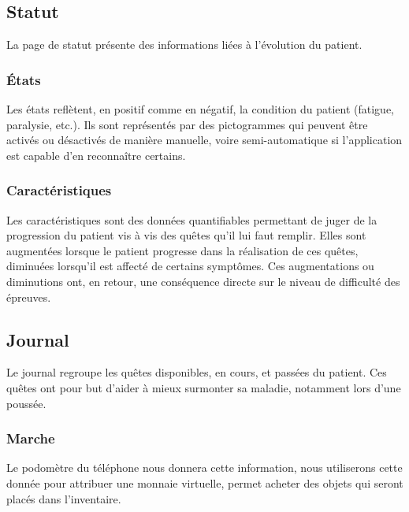 \documentclass[a4paper,12pt,francais]{article}
\begin{document}
\subsection{Statut}

La page de statut présente des informations liées à l'évolution du patient.

\subsubsection{États}
Les états reflètent, en positif comme en négatif, la condition du patient (fatigue, paralysie, etc.). Ils sont représentés par des pictogrammes qui peuvent être activés ou désactivés de manière manuelle, voire semi-automatique si l'application est capable d'en reconnaître certains.

\subsubsection{Caractéristiques}
Les caractéristiques sont des données quantifiables permettant de juger de la progression du patient vis à vis des quêtes qu'il lui faut remplir. Elles sont augmentées lorsque le patient progresse dans la réalisation de ces quêtes, diminuées lorsqu'il est affecté de certains symptômes. Ces augmentations ou diminutions ont, en retour, une conséquence directe sur le niveau de difficulté des épreuves.

\subsection{Journal}
Le journal regroupe les quêtes disponibles, en cours, et passées du patient. Ces quêtes ont pour but d'aider à mieux surmonter sa maladie, notamment lors d'une poussée.


\subsubsection{Marche}
Le podomètre du téléphone nous donnera cette information, nous utiliserons cette donnée pour attribuer une monnaie virtuelle, permet acheter des objets qui seront placés dans l'inventaire.
\end{document}

